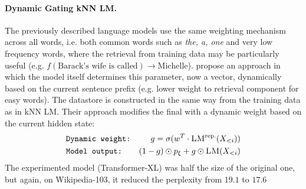 \paragraph{Dynamic Gating kNN LM.}
The previously described language models use the same weighting mechanism across all words, i.e. both common words such as \textit{the, a, one} and very low frequency words, where the retrieval from training data may be particularly useful (e.g. $f(\text{Barack's wife is called}) \rightarrow \text{Michelle}$).
\citet{yogatama2021adaptive} propose an approach in which the model itself determines this parameter, now a vector, dynamically based on the current sentence prefix (e.g. lower weight to retrieval component for easy words).
The datastore is constructed in the same way from the training data as in kNN LM.
Their approach modifies the final  with a dynamic weight based on the current hidden state:
\begin{align}
& \texttt{Dynamic weight:} & g = \sigma(w^T \cdot \textsc{LM}^\text{rep.}(X_{<i})) \\
& \texttt{Model output:} &  (1-g) \odot p_\xi + g \odot \textsc{LM}(X_{<i})
\end{align}
The experimented model (Transformer-XL) was half the size of the original one, but again, on Wikipedia-103, it reduced the perplexity from $19.1$ to $17.6$


